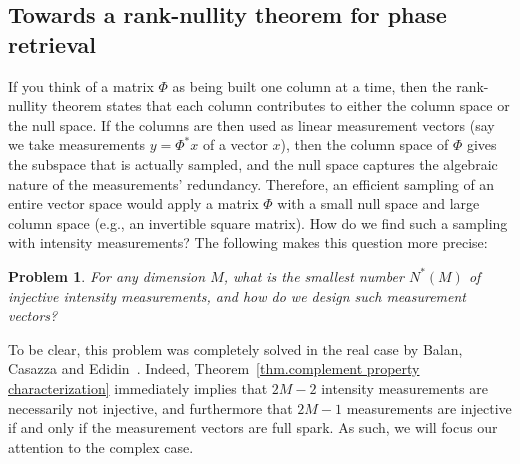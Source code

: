 \documentclass[times,10pt]{elsarticle}
\theoremstyle{plain}
\newtheorem{problem}[theorem]{Problem}
\begin{document}
\subsection{Towards a rank-nullity theorem for phase retrieval}

If you think of a matrix $\Phi$ as being built one column at a time, then the rank-nullity theorem states that each column contributes to either the column space or the null space.
If the columns are then used as linear measurement vectors (say we take measurements $y=\Phi^*x$ of a vector $x$), then the column space of $\Phi$ gives the subspace that is actually sampled, and the null space captures the algebraic nature of the measurements' redundancy.
Therefore, an efficient sampling of an entire vector space would apply a matrix $\Phi$ with a small null space and large column space (e.g., an invertible square matrix).
How do we find such a sampling with intensity measurements?
The following makes this question more precise:
\
\begin{problem}
\label{prob.n star}
For any dimension $M$, what is the smallest number $N^*(M)$ of injective intensity measurements, and how do we design such measurement vectors?
\end{problem}

To be clear, this problem was completely solved in the real case by Balan, Casazza and Edidin~\cite{BalanCE:06}.
Indeed, Theorem~\ref{thm.complement property characterization} immediately implies that $2M-2$ intensity measurements are necessarily not injective, and furthermore that $2M-1$ measurements are injective if and only if the measurement vectors are full spark. 
As such, we will focus our attention to the complex case.
\end{document}
